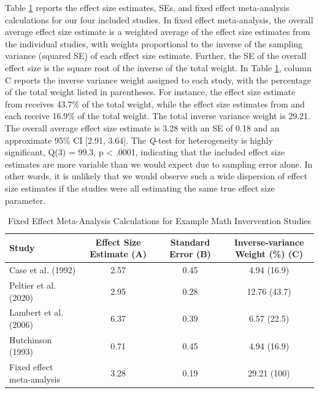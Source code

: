 \documentclass[
]{book}
\begin{document}
Table \ref{tab:ES-est} reports the effect size estimates, SEs, and fixed effect meta-analysis calculations for our four included studies. In fixed effect meta-analysis, the overall average effect size estimate is a weighted average of the effect size estimates from the individual studies, with weights proportional to the inverse of the sampling variance (squared SE) of each effect size estimate. Further, the SE of the overall effect size is the square root of the inverse of the total weight. In Table \ref{tab:ES-est}, column C reports the inverse variance weight assigned to each study, with the percentage of the total weight listed in parentheses. For instance, the effect size estimate from \citet{peltier2020Effects} receives 43.7\% of the total weight, while the effect size estimates from \citet{case1992Improving} and \citet{hutchinson1993Effects} each receive 16.9\% of the total weight. The total inverse variance weight is 29.21. The overall average effect size estimate is 3.28 with an SE of 0.18 and an approximate \(95\%\) CI {[}2.91, 3.64{]}. The \emph{Q}-test for heterogeneity is highly significant, Q(3) = 99.3, p \textless{} .0001, indicating that the included effect size estimates are more variable than we would expect due to sampling error alone. In other words, it is unlikely that we would observe such a wide dispersion of effect size estimates if the studies were all estimating the same true effect size parameter.

\begin{table}

\caption{\label{tab:ES-est}Fixed Effect Meta-Analysis Calculations for 
             Example Math Invervention Studies}
\centering
\begin{tabular}[t]{l|c|c|c}
\hline
Study & Effect Size Estimate (A) & Standard Error (B) & Inverse-variance Weight (\%) (C)\\
\hline
Case et al. (1992) & 2.57 & 0.45 & 4.94 (16.9)\\
\hline
Peltier et al. (2020) & 2.95 & 0.28 & 12.76 (43.7)\\
\hline
Lambert et al. (2006) & 6.37 & 0.39 & 6.57 (22.5)\\
\hline
Hutchinson (1993) & 0.71 & 0.45 & 4.94 (16.9)\\
\hline
Fixed effect meta-analysis & 3.28 & 0.19 & 29.21 (100)\\
\hline
\end{tabular}
\end{table}
\end{document}
